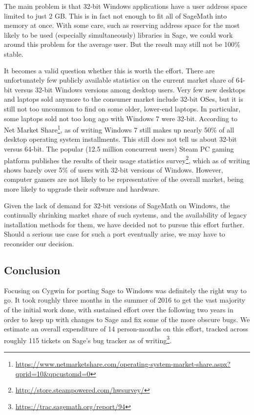 The main problem is that 32-bit Windows applications have a user address
space limited to just 2 GB. This is in fact not enough to fit all of
SageMath into memory at once. With some care, such as reserving address
space for the most likely to be used (especially simultaneously)
libraries in Sage, we could work around this problem for the average user.
But the result may still not be 100\% stable.

It becomes a valid question whether this is worth the effort. There are
unfortunately few publicly available statistics on the current market
share of 64-bit versus 32-bit Windows versions among desktop users. Very
few new desktops and laptops sold anymore to the consumer market include
32-bit OSes, but it is still not too uncommon to find on some older,
lower-end laptops. In particular, some laptops sold not too long ago
with Windows 7 were 32-bit. According to Net Market Share\footnote{\url{https://www.netmarketshare.com/operating-system-market-share.aspx?qprid=10\&qpcustomd=0}},
as of writing Windows 7 still makes up nearly 50\% of all desktop
operating system installments. This still does not tell us about 32-bit
versus 64-bit. The popular (12.5 million concurrent users) Steam PC
gaming platform publishes the results of their usage statistics
survey\footnote{\url{http://store.steampowered.com/hwsurvey/}}, which as
of writing shows barely over 5\% of users with 32-bit versions of
Windows. However, computer gamers are not likely to be representative of
the overall market, being more likely to upgrade their software and
hardware.

Given the lack of demand for 32-bit versions of SageMath on Windows, the
continually shrinking market share of such systems, and the availability of
legacy installation methods for them, we have decided not to pursue this effort
further. Should a serious use case for such a port eventually arise, we may
have to reconsider our decision.

\hypertarget{conclusion}{%
\subsection{Conclusion}\label{conclusion}}

Focusing on Cygwin for porting Sage to Windows was definitely the right way to
go. It took roughly three months in the summer of 2016 to get the vast majority
of the initial work done, with sustained effort over the following two years in
order to keep up with changes to Sage and fix some of the more obscure bugs.
We estimate an overall expenditure of 14 person-months on this effort, tracked
across roughly 115 tickets on Sage's bug tracker as of
writing\footnote{\url{https://trac.sagemath.org/report/94}}.

